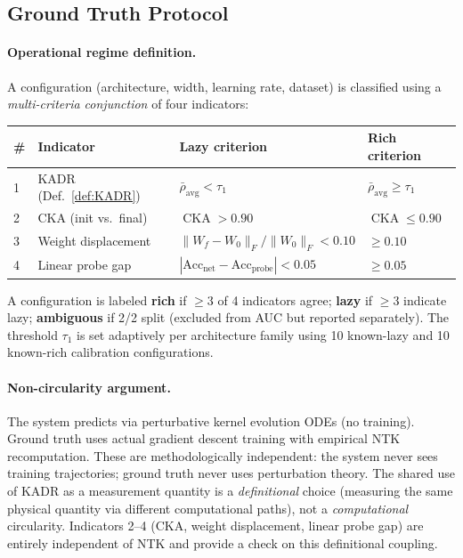 \documentclass[11pt]{article}
\theoremstyle{definition}
\DeclareMathOperator{\CKA}{CKA}
\newcommand{\norm}[1]{\lVert #1 \rVert}
\begin{document}
\subsection{Ground Truth Protocol}
\label{sec:ground-truth}

\paragraph{Operational regime definition.} A configuration (architecture, width, learning rate, dataset) is classified using a \emph{multi-criteria conjunction} of four indicators:

\begin{center}
\begin{tabular}{@{}llll@{}}
\toprule
\# & Indicator & Lazy criterion & Rich criterion \\
\midrule
1 & KADR (Def.~\ref{def:KADR}) & $\bar{\rho}_{\mathrm{avg}} < \tau_1$ & $\bar{\rho}_{\mathrm{avg}} \ge \tau_1$ \\
2 & CKA (init vs.\ final) & $\CKA > 0.90$ & $\CKA \le 0.90$ \\
3 & Weight displacement & $\norm{W_f - W_0}_F/\norm{W_0}_F < 0.10$ & $\ge 0.10$ \\
4 & Linear probe gap & $|\text{Acc}_{\mathrm{net}} - \text{Acc}_{\mathrm{probe}}| < 0.05$ & $\ge 0.05$ \\
\bottomrule
\end{tabular}
\end{center}

A configuration is labeled \textbf{rich} if $\ge 3$ of 4 indicators agree; \textbf{lazy} if $\ge 3$ indicate lazy; \textbf{ambiguous} if 2/2 split (excluded from AUC but reported separately). The threshold $\tau_1$ is set adaptively per architecture family using 10 known-lazy and 10 known-rich calibration configurations.

\paragraph{Non-circularity argument.} The system predicts via perturbative kernel evolution ODEs (no training). Ground truth uses actual gradient descent training with empirical NTK recomputation. These are methodologically independent: the system never sees training trajectories; ground truth never uses perturbation theory. The shared use of KADR as a measurement quantity is a \emph{definitional} choice (measuring the same physical quantity via different computational paths), not a \emph{computational} circularity. Indicators 2--4 (CKA, weight displacement, linear probe gap) are entirely independent of NTK and provide a check on this definitional coupling.
\end{document}
